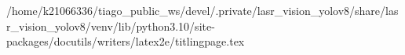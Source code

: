 /home/k21066336/tiago_public_ws/devel/.private/lasr_vision_yolov8/share/lasr_vision_yolov8/venv/lib/python3.10/site-packages/docutils/writers/latex2e/titlingpage.tex